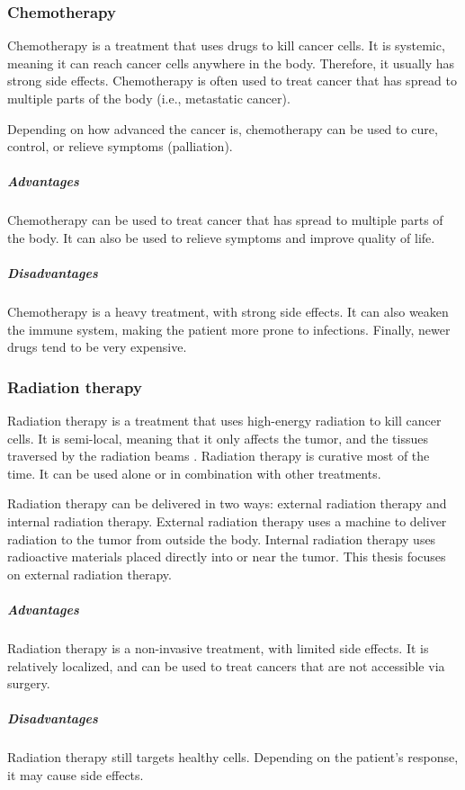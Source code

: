 \subsubsection{Chemotherapy}
Chemotherapy is a treatment that uses drugs to kill cancer cells.
It is systemic, meaning it can reach cancer cells anywhere in the body.
Therefore, it usually has strong side effects.
Chemotherapy is often used to treat cancer that has spread to multiple parts of the body (i.e., metastatic cancer).

Depending on how advanced the cancer is, chemotherapy can be used to cure, control, or relieve symptoms (palliation).

\subparagraph{Advantages}
Chemotherapy can be used to treat cancer that has spread to multiple parts of the body.
It can also be used to relieve symptoms and improve quality of life.

\subparagraph{Disadvantages}
Chemotherapy is a heavy treatment, with strong side effects.
It can also weaken the immune system, making the patient more prone to infections.
Finally, newer drugs tend to be very expensive.

\subsubsection{Radiation therapy}
Radiation therapy is a treatment that uses high-energy radiation to kill cancer cells.
It is semi-local, meaning that it only affects the tumor, and the tissues traversed by the radiation beams \cite{Thariat2013}.
Radiation therapy is curative most of the time.
It can be used alone or in combination with other treatments.

Radiation therapy can be delivered in two ways: external radiation therapy and internal radiation therapy.
External radiation therapy uses a machine to deliver radiation to the tumor from outside the body.
Internal radiation therapy uses radioactive materials placed directly into or near the tumor.
This thesis focuses on external radiation therapy.

\subparagraph{Advantages}
Radiation therapy is a non-invasive treatment, with limited side effects.
It is relatively localized, and can be used to treat cancers that are not accessible via surgery.

\subparagraph{Disadvantages}
Radiation therapy still targets healthy cells.
Depending on the patient's response, it may cause side effects.


